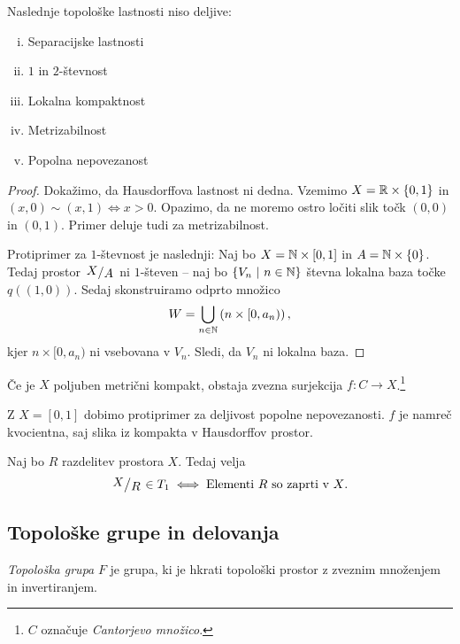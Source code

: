 \begin{trditev}
Naslednje topološke lastnosti niso deljive:

\begin{multicols}{2}
\begin{enumerate}[i)]
\item Separacijske lastnosti
\item $1$ in $2$-števnost
\item Lokalna kompaktnost
\item Metrizabilnost
\item Popolna nepovezanost
\end{enumerate}
\end{multicols}
\end{trditev}

\begin{proof}
Dokažimo, da Hausdorffova lastnost ni dedna. Vzemimo
$X = \mathbb{R} \times \left\{0, 1\right\}$ in $(x,0) \sim (x,1) \iff x > 0$.
Opazimo, da ne moremo ostro ločiti slik točk $(0,0)$ in $(0,1)$.
Primer deluje tudi za metrizabilnost.

Protiprimer za $1$-števnost je naslednji: Naj bo
$X = \mathbb{N} \times [0,1]$ in $A = \mathbb{N} \times \left\{0\right\}$. Tedaj prostor
$\kvoc{X}{A}$ ni $1$-števen -- naj bo $\left\{V_n~\middle\vert~n \in \mathbb{N}\right\}$ števna
lokalna baza točke $q((1,0))$. Sedaj skonstruiramo odprto množico
\[
W = \bigcup_{n \in \mathbb{N}} \left(n \times [0, a_n)\right),
\]
kjer $n \times [0, a_n)$ ni vsebovana v $V_n$. Sledi, da $V_n$ ni
lokalna baza.
\end{proof}

\begin{izrek}[Aleksandrov]
Če je $X$ poljuben metrični kompakt, obstaja zvezna surjekcija
$f \colon C \to X$.\footnote{$C$ označuje \emph{Cantorjevo
množico}.}
\end{izrek}

\begin{opomba}
Z $X = [0, 1]$ dobimo protiprimer za deljivost popolne
nepovezanosti. $f$ je namreč kvocientna, saj slika iz kompakta v
Hausdorffov prostor.
\end{opomba}

\begin{trditev}
Naj bo $R$ razdelitev prostora $X$. Tedaj velja
\[
\kvoc{X}{R} \in T_1 \iff \text{Elementi $R$ so zaprti v $X$}.
\]
\end{trditev}

\obvs

\newpage

\subsection{Topološke grupe in delovanja}

\begin{definicija}
\emph{Topološka grupa} $F$ je grupa, ki je
hkrati topološki prostor z zveznim množenjem in invertiranjem.
\end{definicija}
